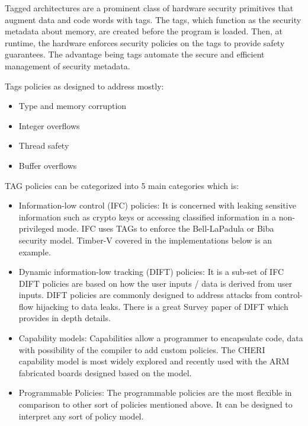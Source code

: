 Tagged architectures are a prominent class of hardware security primitives that augment data and code words
with tags. The tags, which function as the security metadata
about memory, are created before the program is loaded. 
Then, at runtime, the hardware enforces security policies on the tags to provide safety guarantees. 
The advantage being tags automate the secure and efficient management of security metadata. 

Tags policies as designed to address mostly:
\begin{itemize}
  \item Type and memory corruption
  \item Integer overflows
  \item Thread safety
  \item Buffer overflows
\end{itemize}

TAG policies can be categorized into 5 main categories which is:
\begin{itemize}
  \item Information-low control (IFC) policies: It is concerned with 
  leaking sensitive information such as crypto keys or accessing classified 
  information in a non-privileged mode. IFC uses TAGs to enforce the 
  Bell-LaPadula\cite{BellAndLaPadulaSecurityModel} or Biba\cite{Biba} security model. Timber-V\cite{weiser_timber-v_2019} 
  covered in the implementations below is an example.
  \item Dynamic information-low tracking (DIFT) policies: It is a sub-set of IFC
  DIFT policies are based on how the user inputs / data is derived from user 
  inputs. DIFT policies are commonly designed to address attacks from
  control-flow hijacking to data leaks. There is a great Survey paper of 
  DIFT\cite{DIFT} which provides in depth details. 
  \item Capability models: Capabilities allow a programmer to 
  encapsulate code, data with possibility of the compiler to 
  add custom policies. The CHERI capability 
  model is most widely explored\cite{CHERI-RISC} and 
  recently used with the
  ARM fabricated boards\cite{morello} 
  designed based on the model. 
  \item Programmable Policies: The programmable policies 
  are the most flexible in comparison to other 
  sort of policies mentioned above. It can be 
  designed to interpret any sort of policy model.

\end{itemize}

